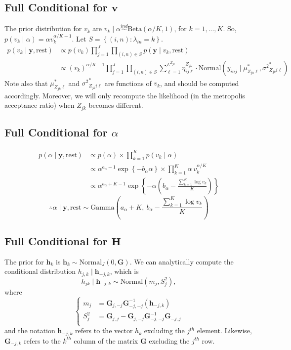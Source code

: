 \documentclass[12pt]{article}
\newcommand{\p}[1]{\left(#1\right)}
\newcommand{\bc}[1]{ \left\{#1\right\} }
\newcommand{\N}{ \mathcal{N} }
\newcommand{\ind}{\overset{ind}{\sim}}
\def\N{\text{Normal}}
\def\G{\text{Gamma}}
\def\Be{\text{Beta}}
\def\lin{\lambda_{in}}
\def\y{\bm{y}}
\def\mus{\mu^*}
\def\sss{{\sigma^2}^*}
\def\rest{\text{rest}}
\def\h{\bm{h}}
\begin{document}
\subsection{\texorpdfstring{Full Conditional for
$\bm v$}{Full Conditional for \textbackslash{}bm v}}\label{full-conditional-for-bm-v}

The prior distribution for $v_k$ are
$v_k \mid \alpha \ind \Be(\alpha/K, 1)$, for $k = 1,...,K$. So,
$p(v_k \mid \alpha) = \alpha v_k^{\alpha/K-1}$.
%
Let $S = \bc{(i,n)\colon \lin = k}$.
%
\begin{align*}
p(v_k \mid \y, \rest) &\propto p(v_k) \prod_{j=1}^J\prod_{(i,n)\in S} p(\y \mid v_k, \rest) \\
&\propto (v_k)^{\alpha/K-1} \prod_{j=1}^J \prod_{(i,n)\in S}
\sum_{\ell=1}^{L^{Z_{jk}}} \eta^{Z_{jk}}_{ij\ell} \cdot
\N(y_{inj} \mid \mus_{Z_{jk}\ell}, \sss_{Z_{jk}i\ell})
\end{align*}
%
%
Note also that $\mus_{Z_{jk}\ell}$ and $\sss_{Z_{jk}i\ell}$ are
functions of $v_k$, and should be computed accordingly. Moreover, we
will only recompute the likelihood (in the metropolis acceptance ratio)
when $Z_{jk}$ becomes different.

\subsection{\texorpdfstring{Full Conditional for
$\alpha$}{Full Conditional for \textbackslash{}alpha}}\label{full-conditional-for-alpha}

\begin{align*}
p(\alpha \mid \y, \rest) &\propto p(\alpha) \times \prod_{k=1}^K p(v_k \mid \alpha) \\
&\propto \alpha^{a_\alpha - 1} \exp\bc{-b_\alpha \alpha} \times \prod_{k=1}^K 
\alpha~v_k^{\alpha/K} \\
&\propto \alpha^{a_\alpha + K -1} \exp\bc{-\alpha\p{b_\alpha - 
\frac{\sum_{k=1}^K \log v_k}{K}}}
\end{align*}
%
$$
\therefore \alpha \mid \y, \rest \sim 
\G\p{a_\alpha + K,~ b_\alpha - \frac{\sum_{k=1}^K \log v_k}{K}}
$$

\subsection{\texorpdfstring{Full Conditional for
$\bm H$}{Full Conditional for \textbackslash{}bm H}}\label{full-conditional-for-bm-h}

The prior for $\h_k$ is $\h_k \sim \N_J(0, \bm G)$. We can
analytically compute the conditional distribution
$h_{j,k} \mid \h_{-j,k}$, which is
%
$$
h_{jk}  \mid \h_{-j,k} \sim \N(m_j, S^2_j),
$$
%
where
%
$$
\begin{cases}
m_j &= \bm G_{j,-j} \bm G_{-j,-j}^{-1}(\h_{-j,k})\\
S_j^2 &= \bm G_{j,j} - \bm G_{j,-j}\bm G_{-j,-j}^{-1}\bm G_{-j,j}\\
\end{cases}
$$
%
and the notation $\h_{-j,k}$ refers to the vector $h_k$ excluding
the $j^{th}$ element. Likewise, $\bm G_{-j,k}$ refers to the
$k^{th}$ column of the matrix $\bm G$ excluding the $j^{th}$ row.
\end{document}
